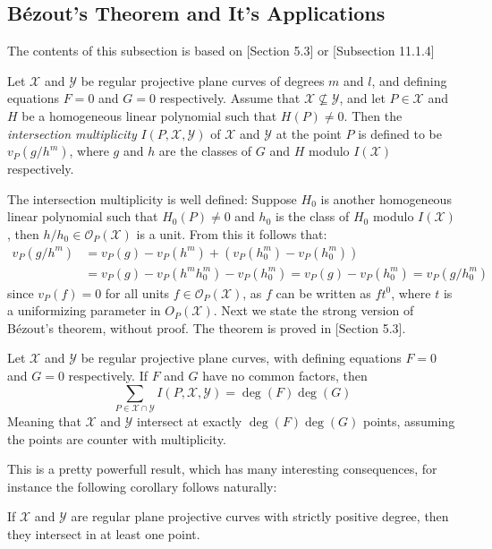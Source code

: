 \subsection{Bézout’s Theorem and It's Applications} \label{subsec:bezouts}
The contents of this subsection is based on \cite{Fulton}[Section 5.3] or \cite{CCC_with_CA}[Subsection 11.1.4]

\begin{definition}\label{def:intersection_multiplicity}
  Let $\mathcal{X}$ and $\mathcal{Y}$ be regular projective plane curves of degrees $m$ and $l$, and defining equations $F = 0$ and $G = 0$ respectively. Assume that $\mathcal{X} \not \subseteq \mathcal{Y}$, and let $P \in \mathcal{X}$ and $H$ be a homogeneous linear polynomial such that $H(P) \neq 0$. Then the \textit{intersection multiplicity} $I(P, \mathcal{X}, \mathcal{Y})$ of $\mathcal{X}$ and $\mathcal{Y}$ at the point $P$ is defined to be $v_{P}(g / h^{m})$, where $g$ and $h$ are the classes of $G$ and $H$ modulo $I(\mathcal{X})$ respectively.
\end{definition}
The intersection multiplicity is well defined: Suppose $H_{0}$ is another homogeneous linear polynomial such that $H_{0}(P) \neq 0$ and $h_{0}$ is the class of $H_{0}$ modulo $I(\mathcal{X})$, then $h / h_{0} \in \mathcal{O}_{P}(\mathcal{X})$ is a unit. From this it follows that:
\begin{align*}
  v_{P}(g / h^{m}) &= v_{P}(g) - v_{P}(h^{m}) + (v_{P}(h_{0}^{m}) - v_{P}(h_{0}^{m}))\\ &= v_{P}(g) - v_{P}(h^{m} h_{0}^{m}) - v_{P}(h_{0}^{m}) = v_{P}(g) - v_{P}(h_{0}^{m}) = v_{P}(g / h_{0}^{m})
\end{align*}
since $v_{P}(f) = 0$ for all units $f \in \mathcal{O}_{P}(\mathcal{X})$, as $f$ can be written as $f t^{0}$, where $t$ is a uniformizing parameter in $O_{P}(\mathcal{X})$. Next we state the strong version of Bézout's theorem, without proof. The theorem is proved in \cite{Fulton}[Section 5.3].
\begin{theorem}\label{thm:bézouts}
  Let $\mathcal{X}$ and $\mathcal{Y}$ be regular projective plane curves, with defining equations $F = 0$ and $G = 0$ respectively. If $F$ and $G$ have no common factors, then
  \begin{equation*}
    \sum_{P \in \mathcal{X} \cap \mathcal{Y}} I(P, \mathcal{X}, \mathcal{Y}) = \deg(F) \deg(G)
  \end{equation*}
  Meaning that $\mathcal{X}$ and $\mathcal{Y}$ intersect at exactly $\deg(F)\deg(G)$ points, assuming the points are counter with multiplicity.
\end{theorem}
This is a pretty powerfull result, which has many interesting consequences, for instance the following corollary follows naturally:
\begin{corollary}\label{cor:intersect_in_at_least_one_point}
  If $\mathcal{X}$ and $\mathcal{Y}$ are regular plane projective curves with strictly positive degree, then they intersect in at least one point.
\end{corollary}

